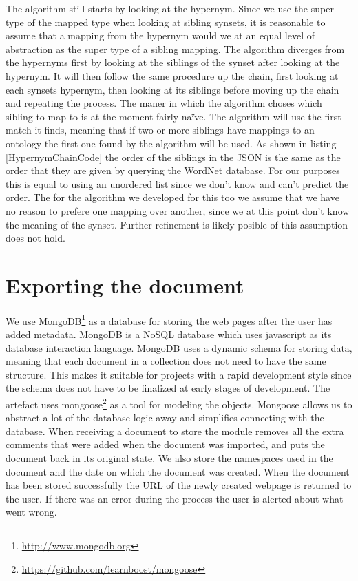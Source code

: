 The algorithm still starts by looking at the hypernym.
Since we use the super type of the mapped type when looking at sibling synsets,
it is reasonable to assume that a mapping from the hypernym would we at an equal level of abstraction as the
super type of a sibling mapping.
The algorithm diverges from the hypernyms first by looking at the siblings of the synset after looking at the hypernym.
It will then follow the same procedure up the chain, first looking at each synsets hypernym,
then looking at its siblings before moving up the chain and repeating the process.
The maner in which the algorithm choses which sibling to map to is at the moment fairly naïve.
The algorithm will use the first match it finds,
meaning that if two or more siblings have mappings to an ontology the first one found by the algorithm will be used.
As shown in listing \ref{HypernymChainCode} the order of the siblings in the JSON is the same as the order that they
are given by querying the WordNet database.
For our purposes this is equal to using an unordered list since we don't know and can't predict the order.
The for the algorithm we developed for this too we assume  that we have no reason to prefere one mapping over another,
since we at this point don't know the meaning of the synset.
Further refinement is likely posible of this assumption does not hold.




\section{Exporting the document}
We use MongoDB\footnote{\url{http://www.mongodb.org}} as a database for storing the web pages after the user has added metadata.
MongoDB is a NoSQL database which uses javascript as its database interaction language.
MongoDB uses a dynamic schema for storing data,
meaning that each document in a collection does not need to have the same structure.
This makes it suitable for projects with a rapid development style since the schema does not have to be
finalized at early stages of development.
The artefact uses mongoose\footnote{\url{https://github.com/learnboost/mongoose}} as a tool for modeling the objects.
Mongoose allows us to abstract a lot of the database logic away and simplifies connecting with the database.
When receiving a document to store the module removes all the extra comments that were added when the document was
imported, and puts the document back in its original state.
We also store the namespaces used in the document and the date on which the document was created.
When the document has been stored successfully the URL of the newly created webpage is returned to the user.
If there was an error during the process the user is alerted about what went wrong.

